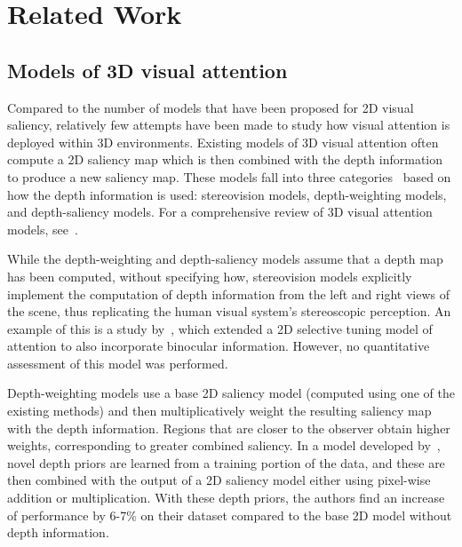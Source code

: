 \documentclass[12pt]{article}
\begin{document}
\section{Related Work}
\subsection{Models of 3D visual attention}
Compared to the number of models that have been proposed for 2D visual
saliency, relatively few attempts have been made to study how visual
attention is deployed within 3D environments. Existing models of 3D
visual attention often compute a 2D saliency map which is then combined
with the depth information to produce a new saliency map. These models
fall into three categories~\citep{Wang_etal13} based on how the depth
information is used:
stereovision models, depth-weighting models, and depth-saliency models.
For a comprehensive review of 3D visual
attention models, see~\cite{Wang_etal13,Ma_Hang15}.

While the depth-weighting and depth-saliency models assume that a
depth map has been computed, without specifying how, stereovision
models explicitly implement the computation of depth information from
the left and right views of the scene, thus replicating the human
visual system's stereoscopic perception.  An example of this is a
study by~\cite{Bruce_Tsotsos05}, which extended a 2D selective tuning
model of attention to also incorporate binocular information. However,
no quantitative assessment of this model was performed.

Depth-weighting models use a base 2D saliency model (computed using
one of the existing methods) and then multiplicatively weight the
resulting saliency map with the depth information. Regions that are
closer to the observer obtain higher weights, corresponding to greater
combined saliency. In a model developed by~\cite{Lang_etal12}, novel
depth priors are learned from a training portion of the data, and
these are then combined with the output of a 2D saliency model either
using pixel-wise addition or multiplication. With these depth priors,
the authors find an increase of performance by 6-7\% on their dataset
compared to the base 2D model without depth information.
\end{document}

